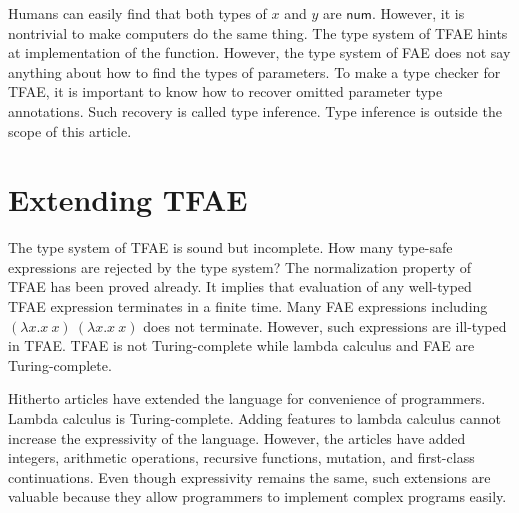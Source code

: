 
Humans can easily find that both types of $x$ and $y$ are $\textsf{num}$.
However, it is nontrivial to make computers do the same thing. The type system
of TFAE hints at implementation of the  function. However, the
type
system of FAE does not say anything about how to find the types of parameters.
To make a type checker for TFAE, it is important to know how to recover omitted
parameter type annotations. Such recovery is called type inference. Type
inference is outside the scope of this article.

\section{Extending TFAE}

The type system of TFAE is sound but incomplete. How many type-safe expressions
are rejected by the type system? The normalization property of TFAE has been
proved already. It implies that evaluation of any well-typed TFAE expression
terminates in a finite time. Many FAE expressions including $(\lambda x.x\ x)\
(\lambda x.x\ x)$ does not terminate. However, such expressions are ill-typed in
TFAE. TFAE is not Turing-complete while lambda calculus and FAE are
Turing-complete.

Hitherto articles have extended the language for convenience of programmers.
Lambda calculus is Turing-complete. Adding features to lambda calculus cannot
increase the expressivity of the language. However, the articles have added
integers, arithmetic operations, recursive functions, mutation, and first-class
continuations. Even though expressivity remains the same, such extensions are
valuable because they allow programmers to implement complex programs easily.

